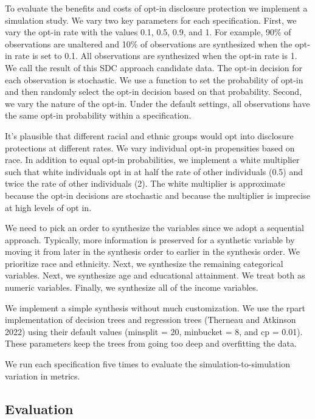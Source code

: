 \documentclass[
]{urban-formatting}
\begin{document}
To evaluate the benefits and costs of opt-in disclosure protection we
implement a simulation study. We vary two key parameters for each
specification. First, we vary the opt-in rate with the values 0.1, 0.5,
0.9, and 1. For example, 90\% of observations are unaltered and 10\% of
observations are synthesized when the opt-in rate is set to 0.1. All
observations are synthesized when the opt-in rate is 1. We call the
result of this SDC approach candidate data. The opt-in decision for each
observation is stochastic. We use a function to set the probability of
opt-in and then randomly select the opt-in decision based on that
probability. Second, we vary the nature of the opt-in. Under the default
settings, all observations have the same opt-in probability within a
specification.

It's plausible that different racial and ethnic groups would opt into
disclosure protections at different rates. We vary individual opt-in
propensities based on race. In addition to equal opt-in probabilities,
we implement a white multiplier such that white individuals opt in at
half the rate of other individuals (0.5) and twice the rate of other
individuals (2). The white multiplier is approximate because the opt-in
decisions are stochastic and because the multiplier is imprecise at high
levels of opt in.

We need to pick an order to synthesize the variables since we adopt a
sequential approach. Typically, more information is preserved for a
synthetic variable by moving it from later in the synthesis order to
earlier in the synthesis order. We prioritize race and ethnicity. Next,
we synthesize the remaining categorical variables. Next, we synthesize
age and educational attainment. We treat both as numeric variables.
Finally, we synthesize all of the income variables.

We implement a simple synthesis without much customization. We use the
rpart implementation of decision trees and regression trees (Therneau
and Atkinson 2022) using their default values (minsplit = 20, minbucket
= 8, and cp = 0.01). These parameters keep the trees from going too deep
and overfitting the data.

We run each specification five times to evaluate the
simulation-to-simulation variation in metrics.

\subsection{Evaluation}
\end{document}
